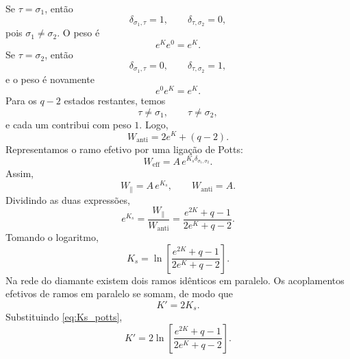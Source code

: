 \documentclass[12pt,a4paper]{article}
\begin{document}
%
Se \(\tau=\sigma_1\), então
%
\begin{equation}
    \delta_{\sigma_1,\tau}=1,
    \qquad
    \delta_{\tau,\sigma_2}=0,
\end{equation}
%
pois \(\sigma_1\neq\sigma_2\). O peso é
%
\begin{equation}
    e^{K}e^{0}=e^{K}.
\end{equation}
%
Se \(\tau=\sigma_2\), então
%
\begin{equation}
    \delta_{\sigma_1,\tau}=0,
    \qquad
    \delta_{\tau,\sigma_2}=1,
\end{equation}
%
e o peso é novamente
%
\begin{equation}
    e^{0}e^{K}=e^{K}.
\end{equation}
%
Para os \(q-2\) estados restantes, temos
%
\begin{equation}
    \tau\neq\sigma_1,
    \qquad
    \tau\neq\sigma_2,
\end{equation}
%
e cada um contribui com peso \(1\). Logo,
%
\begin{equation}
    W_{\mathrm{anti}}
    =
    2e^{K}+(q-2).
    \label{eq:Wanti_potts}
\end{equation}
%
Representamos o ramo efetivo por uma ligação de Potts:
%
\begin{equation}
    W_{\mathrm{eff}}
    =
    A\,e^{K_s\delta_{\sigma_1,\sigma_2}}.
\end{equation}
%
Assim,
%
\begin{equation}
    W_{\parallel}=A\,e^{K_s},
    \qquad
    W_{\mathrm{anti}}=A.
\end{equation}
%
Dividindo as duas expressões,
%
\begin{equation}
    e^{K_s}
    =
    \frac{W_{\parallel}}{W_{\mathrm{anti}}}
    =
    \frac{e^{2K}+q-1}{2e^{K}+q-2}.
\end{equation}
%
Tomando o logaritmo,
%
\begin{equation}
    K_s
    =
    \ln
    \left[
        \frac{e^{2K}+q-1}{2e^{K}+q-2}
    \right].
    \label{eq:Ks_potts}
\end{equation}
% 
Na rede do diamante existem dois ramos idênticos em paralelo. Os
acoplamentos efetivos de ramos em paralelo se somam, de modo que
%
\begin{equation}
    K'=2K_s.
\end{equation}
%
Substituindo \eqref{eq:Ks_potts},
%
\begin{equation}
    \boxed{
    K'
    =
    2\ln
    \left[
        \frac{e^{2K}+q-1}{2e^{K}+q-2}
    \right].
    }
    \label{eq:potts_RG}
\end{equation}
\end{document}
